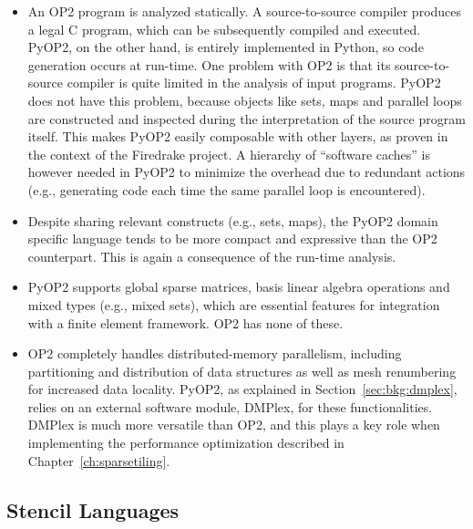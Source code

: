 \begin{itemize}
\item An OP2 program is analyzed statically. A source-to-source compiler produces a legal C program, which can be subsequently compiled and executed. PyOP2, on the other hand, is entirely implemented in Python, so code generation occurs at run-time. One problem with OP2 is that its source-to-source compiler is quite limited in the analysis of input programs. PyOP2 does not have this problem, because objects like sets, maps and parallel loops are constructed and inspected during the interpretation of the source program itself. This makes PyOP2 easily composable with other layers, as proven in the context of the Firedrake project. A hierarchy of ``software caches'' is however needed in PyOP2 to minimize the overhead due to redundant actions (e.g., generating code each time the same parallel loop is encountered).

\item Despite sharing relevant constructs (e.g., sets, maps), the PyOP2 domain specific language tends to be more compact and expressive than the OP2 counterpart. This is again a consequence of the run-time analysis.

\item PyOP2 supports global sparse matrices, basis linear algebra operations and mixed types (e.g., mixed sets), which are essential features for integration with a finite element framework. OP2 has none of these. 

\item OP2 completely handles distributed-memory parallelism, including partitioning and distribution of data structures as well as mesh renumbering for increased data locality. PyOP2, as explained in Section~\ref{sec:bkg:dmplex}, relies on an external software module, DMPlex, for these functionalities. DMPlex is much more versatile than OP2, and this plays a key role when implementing the performance optimization described in Chapter~\ref{ch:sparsetiling}.
\end{itemize}



\subsection{Stencil Languages}
\label{sec:bkg:stencil-lang}


